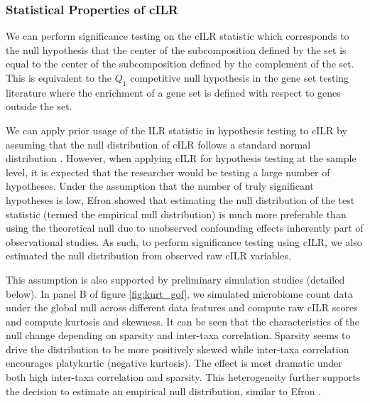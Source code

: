 \documentclass{article}
\begin{document}
\subsubsection*{Statistical Properties of cILR}
We can perform significance testing on the cILR statistic which corresponds to the null hypothesis that the center of the subcomposition defined by the set is equal to the center of the subcomposition defined by the complement of the set. This is equivalent to the $Q_1$ competitive null hypothesis in the gene set testing literature \cite{tian2005} where the enrichment of a gene set is defined with respect to genes outside the set. 

We can apply prior usage of the ILR statistic in hypothesis testing to cILR by assuming that the null distribution of cILR follows a standard normal distribution \cite{egozcue2005}. However, when applying cILR for hypothesis testing at the sample level, it is expected that the researcher would be testing a large number of hypotheses. Under the assumption that the number of truly significant hypotheses is low, Efron \cite{efron2004} showed that estimating the null distribution of the test statistic (termed the empirical null distribution) is much more preferable than using the theoretical null due to unobserved confounding effects inherently part of observational studies. As such, to perform significance testing using cILR, we also estimated the null distribution from observed raw cILR variables. 

This assumption is also supported by preliminary simulation studies (detailed below). In panel B of figure \ref{fig:kurt_gof}, we simulated microbiome count data under the global null across different data features and compute raw cILR scores and compute kurtosis and skewness. It can be seen that the characteristics of the null change depending on sparsity and inter-taxa correlation. Sparsity seems to drive the distribution to be more positively skewed while inter-taxa correlation encourages platykurtic (negative kurtosis). The effect is most dramatic under both high inter-taxa correlation and sparsity. This heterogeneity further supports the decision to estimate an empirical null distribution, similar to Efron \cite{efron2004}. 
\end{document}

